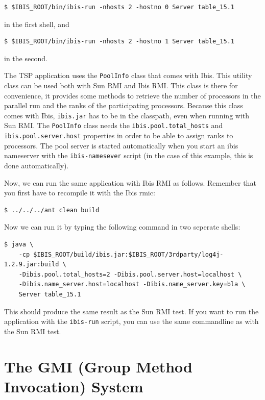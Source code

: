 \documentclass[10pt]{article}
\newcommand{\mysection}[1]{\section{#1}\label{#1}}
\begin{document}
\noindent
{\small
\begin{verbatim}
$ $IBIS_ROOT/bin/ibis-run -nhosts 2 -hostno 0 Server table_15.1
\end{verbatim}
}

\noindent
in the first shell, and

\noindent
{\small
\begin{verbatim}
$ $IBIS_ROOT/bin/ibis-run -nhosts 2 -hostno 1 Server table_15.1
\end{verbatim}
}

\noindent in the second.

The TSP application uses the \texttt{PoolInfo}
class that comes with Ibis. This utility class can be used both with
Sun RMI and Ibis RMI. This class is there for convenience, it provides
some methods to retrieve the number of processors in the parallel run
and the ranks of the participating processors. Because this class
comes with Ibis, \texttt{ibis.jar} has to be in the classpath, even
when running with Sun RMI.  The \texttt{PoolInfo} class needs the
\texttt{ibis.pool.total\_hosts} and \texttt{ibis.pool.server.host}
properties in order to be able to assign ranks to processors. The
pool server is started automatically when you start an ibis nameserver
with the \texttt{ibis-namesever} script (in the case of this example, this is done automatically).

Now, we can run the same application with Ibis RMI as follows.
Remember that you first have to recompile it with the Ibis rmic:

\noindent
{\small
\begin{verbatim}
$ ../../../ant clean build
\end{verbatim}
}
\noindent
Now we can run it by typing the following command in two seperate shells:

\noindent
{\small
\begin{verbatim}
$ java \
    -cp $IBIS_ROOT/build/ibis.jar:$IBIS_ROOT/3rdparty/log4j-1.2.9.jar:build \
    -Dibis.pool.total_hosts=2 -Dibis.pool.server.host=localhost \
    -Dibis.name_server.host=localhost -Dibis.name_server.key=bla \
    Server table_15.1 
\end{verbatim}
}
\noindent

This should produce the same result as the Sun RMI test.
If you want to run the application with the \texttt{ibis-run} script,
you can use the same commandline as with the Sun RMI test.

\mysection{The GMI (Group Method Invocation) System}
\label{gmi-sec}
\end{document}
